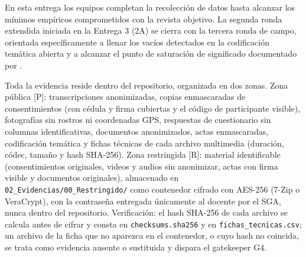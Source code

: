 \documentclass[11pt,a4paper]{article}
\begin{document}
En esta entrega los equipos completan la recolección de datos hasta alcanzar los mínimos empíricos comprometidos con la revista objetivo.
La segunda ronda extendida iniciada en la Entrega 3 (2A) se cierra con la tercera ronda de campo, orientada específicamente a llenar los vacíos detectados en la codificación temática abierta y a alcanzar el punto de saturación de significado documentado por \cite{hennink2017saturation}.

\begin{evidbox}[title=Zonas de evidencia --- se conservan de la Entrega 3 (2A)]
    Toda la evidencia reside dentro del repositorio, organizada en dos zonas.
    Zona pública [P]: transcripciones anonimizadas, copias enmascaradas de consentimientos (con cédula y firma cubiertas y el código de participante visible), fotografías sin rostros ni coordenadas GPS, respuestas de cuestionario sin columnas identificativas, documentos anonimizados, actas enmascaradas, codificación temática y fichas técnicas de cada archivo multimedia (duración, códec, tamaño y hash SHA-256).
    Zona restringida [R]: material identificable (consentimientos originales, videos y audios sin anonimizar, actas con firma visible y documentos originales), almacenado en \texttt{02\_Evidencias/00\_Restringido/} como contenedor cifrado con AES-256 (7-Zip o VeraCrypt), con la contraseña entregada únicamente al docente por el SGA, nunca dentro del repositorio.
    Verificación: el hash SHA-256 de cada archivo se calcula antes de cifrar y consta en \texttt{checksums.sha256} y en \texttt{fichas\_tecnicas.csv}; un archivo de la ficha que no aparezca en el contenedor, o cuyo hash no coincida, se trata como evidencia ausente o sustituida y dispara el gatekeeper G4.
\end{evidbox}
\end{document}
